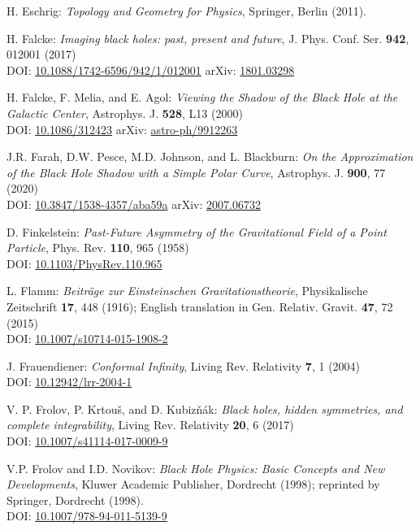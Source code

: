 \begin{thebibliography}{123}
H. Eschrig: {\em Topology and Geometry for Physics},
Springer, Berlin (2011).

H. Falcke:
{\em Imaging black holes: past, present and future},
J. Phys. Conf. Ser. {\bf 942}, 012001 (2017)\\
DOI: \href{https://doi.org/10.1088/1742-6596/942/1/012001}{10.1088/1742-6596/942/1/012001}\hfill
arXiv: \href{https://arxiv.org/abs/1801.03298}{1801.03298}

H. Falcke, F. Melia, and E. Agol:
{\em Viewing the Shadow of the Black Hole at the Galactic Center},
Astrophys. J. {\bf 528}, L13 (2000)\\
DOI: \href{https://doi.org/10.1086/312423}{10.1086/312423}\hfill
arXiv: \href{https://arxiv.org/abs/astro-ph/9912263}{astro-ph/9912263}

J.R. Farah, D.W. Pesce, M.D. Johnson, and L. Blackburn:
{\em On the Approximation of the Black Hole Shadow with a Simple Polar Curve},
Astrophys. J. {\bf 900}, 77 (2020)\\
DOI: \href{https://doi.org/10.3847/1538-4357/aba59a}{10.3847/1538-4357/aba59a}\hfill
arXiv: \href{https://arxiv.org/abs/2007.06732}{2007.06732}

D. Finkelstein:
{\em Past-Future Asymmetry of the Gravitational Field of a Point Particle},
Phys. Rev. {\bf 110}, 965 (1958)\\
DOI: \href{https://doi.org/10.1103/PhysRev.110.965}{10.1103/PhysRev.110.965}

L. Flamm: {\em Beiträge zur Einsteinschen Gravitationstheorie},
Physikalische Zeitschrift {\bf 17}, 448 (1916); English translation in
Gen. Relativ. Gravit. {\bf 47}, 72 (2015)\\
DOI: \href{https://doi.org/10.1007/s10714-015-1908-2}{10.1007/s10714-015-1908-2}

J. Frauendiener:
{\em Conformal Infinity},
Living Rev. Relativity {\bf 7}, 1 (2004) \\
DOI: \href{https://doi.org/10.12942/lrr-2004-1}{10.12942/lrr-2004-1}

V. P. Frolov, P. Krtouš, and D. Kubizňák:
{\em Black holes, hidden symmetries, and complete integrability},
Living Rev. Relativity {\bf 20}, 6 (2017) \\
DOI: \href{https://doi.org/10.1007/s41114-017-0009-9}{10.1007/s41114-017-0009-9}

V.P. Frolov and I.D. Novikov: {\em Black Hole Physics:
Basic Concepts and New Developments},
Kluwer Academic Publisher, Dordrecht (1998); reprinted by
Springer, Dordrecht (1998). \\
DOI: \href{https://doi.org/10.1007/978-94-011-5139-9}{10.1007/978-94-011-5139-9}


\end{thebibliography}
